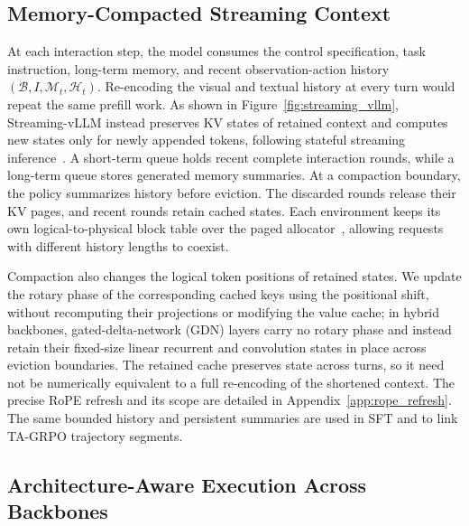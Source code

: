 \subsection{Memory-Compacted Streaming Context}
\label{sec:streaming_context}

At each interaction step, the model consumes the control specification, task instruction, long-term memory, and recent observation-action history $(\mathcal B,I,\mathcal M_t,\mathcal H_t)$. Re-encoding the visual and textual history at every turn would repeat the same prefill work. As shown in Figure~\ref{fig:streaming_vllm}, Streaming-vLLM instead preserves KV states of retained context and computes new states only for newly appended tokens, following stateful streaming inference~\cite{xiao2024streamingllm,xu2026streamingvlm}. A short-term queue holds recent complete interaction rounds, while a long-term queue stores generated memory summaries. At a compaction boundary, the policy summarizes history before eviction. The discarded rounds release their KV pages, and recent rounds retain cached states. Each environment keeps its own logical-to-physical block table over the paged allocator~\cite{kwon2023pagedattention}, allowing requests with different history lengths to coexist.

Compaction also changes the logical token positions of retained states. We update the rotary phase of the corresponding cached keys using the positional shift, without recomputing their projections or modifying the value cache; in hybrid backbones, gated-delta-network (GDN) layers carry no rotary phase and instead retain their fixed-size linear recurrent and convolution states in place across eviction boundaries. The retained cache preserves state across turns, so it need not be numerically equivalent to a full re-encoding of the shortened context. The precise RoPE refresh and its scope are detailed in Appendix~\ref{app:rope_refresh}. The same bounded history and persistent summaries are used in SFT and to link TA-GRPO trajectory segments.

\subsection{Architecture-Aware Execution Across Backbones}
\label{sec:streaming_backend}

